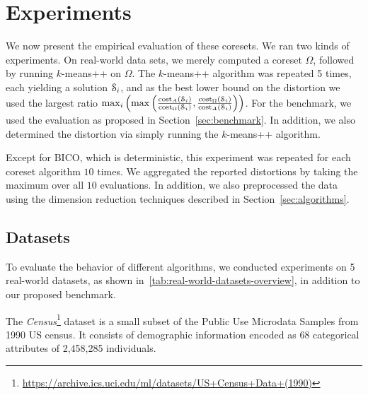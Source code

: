 \section{Experiments} \label{sec:experiments}

We now present the empirical evaluation of these coresets.
We ran two kinds of experiments. On real-world data sets, we merely computed a coreset $\Omega$, followed by running $k$-means++ on $\Omega$. 
The $k$-means++ algorithm was repeated 5 times, each yielding a solution $\mathcal{S}_i$, and as the best lower bound on the distortion we used the largest ratio $\max_i\left(\max\left(\frac{\text{cost}_A(\mathcal{S}_i)}{\text{cost}_{\Omega}(\mathcal{S}_i)},\frac{\text{cost}_{\Omega}(\mathcal{S}_i)}{\text{cost}_A(\mathcal{S}_i)}\right)\right)$.
For the benchmark, we used the evaluation as proposed in Section~\ref{sec:benchmark}. In addition, we also determined the distortion via simply running the $k$-means++ algorithm. 

Except for BICO, which is deterministic, this experiment was repeated for each coreset algorithm $10$ times.  We aggregated the reported distortions by taking the maximum over all $10$ evaluations. In addition, we also preprocessed the data using the dimension reduction techniques described in Section~\ref{sec:algorithms}.


\subsection{Datasets}
To evaluate the behavior of different algorithms, we conducted experiments on 5 real-world datasets, as shown in~\cref{tab:real-world-datasets-overview}, in addition to our proposed benchmark.


The \textit{Census}\footnote{\url{https://archive.ics.uci.edu/ml/datasets/US+Census+Data+(1990)}} dataset is a small subset of the Public Use Microdata Samples from 1990 US census. It consists of demographic information encoded as 68 categorical attributes of 2,458,285 individuals. 

